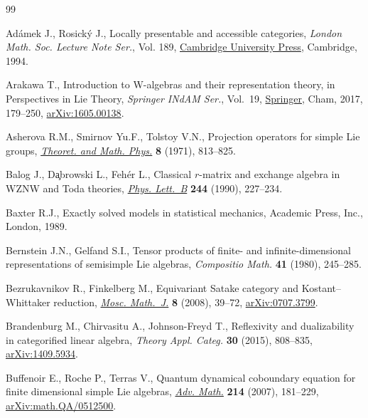 \documentclass[10pt,a4paper]{amsart}
\numberwithin{equation}{section}
\let\OAoriginalcedilla\c
\renewcommand{\c}[1]{{\OAaccentfont\OAoriginalcedilla{#1}}}
\begin{document}
\begin{thebibliography}{99}
\footnotesize\itemsep=0pt

Ad\'amek J., Rosick\'y J., Locally presentable and accessible categories,
 \textit{London Math. Soc. Lecture Note Ser.}, Vol. 189, \href{https://doi.org/10.1017/CBO9780511600579}{Cambridge University
 Press}, Cambridge, 1994.

Arakawa T., Introduction to {W}-algebras and their representation theory, in
 Perspectives in {L}ie {T}heory, \textit{Springer INdAM Ser.}, Vol.~19,
 \href{https://doi.org/10.1007/978-3-319-58971-8_4}{Springer}, Cham, 2017, 179--250, \href{https://arxiv.org/abs/1605.00138}{arXiv:1605.00138}.

Asherova R.M., Smirnov Yu.F., Tolstoy V.N., Projection operators for simple
 {L}ie groups, \href{https://doi.org/10.1007/BF01038003}{\textit{Theoret. and Math. Phys.}} \textbf{8} (1971), 813--825.

Balog J., D\c{a}browski L., Feh\'er L., Classical {$r$}-matrix and exchange
 algebra in {WZNW} and {T}oda theories, \href{https://doi.org/10.1016/0370-2693(90)90060-J}{\textit{Phys. Lett.~B}} \textbf{244}
 (1990), 227--234.

Baxter R.J., Exactly solved models in statistical mechanics, Academic Press,
 Inc., London, 1989.

Bernstein J.N., Gelfand S.I., Tensor products of finite- and
 infinite-dimensional representations of semisimple {L}ie algebras,
 \textit{Compositio Math.} \textbf{41} (1980), 245--285.

Bezrukavnikov R., Finkelberg M., Equivariant {S}atake category and
 {K}ostant--{W}hittaker reduction, \href{https://doi.org/10.17323/1609-4514-2008-8-1-39-72}{\textit{Mosc. Math.~J.}} \textbf{8} (2008),
 39--72, \href{https://arxiv.org/abs/0707.3799}{arXiv:0707.3799}.

Brandenburg M., Chirvasitu A., Johnson-Freyd T., Reflexivity and dualizability
 in categorified linear algebra, \textit{Theory Appl. Categ.} \textbf{30}
 (2015), 808--835, \href{https://arxiv.org/abs/1409.5934}{arXiv:1409.5934}.

Buffenoir E., Roche P., Terras V., Quantum dynamical coboundary equation for
 finite dimensional simple {L}ie algebras, \href{https://doi.org/10.1016/j.aim.2007.02.001}{\textit{Adv. Math.}} \textbf{214}
 (2007), 181--229, \href{https://arxiv.org/abs/math.QA/0512500}{arXiv:math.QA/0512500}.


\end{thebibliography}
\end{document}
